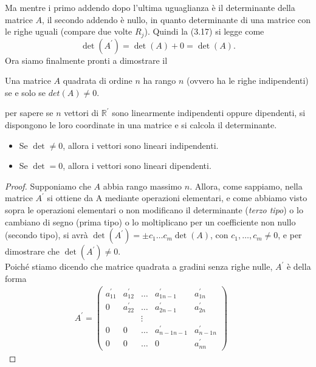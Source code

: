 Ma mentre i primo addendo dopo l'ultima uguaglianza è il determinante della matrice $A$, il
secondo addendo è nullo, in quanto determinante di una matrice con le righe uguali (compare
due volte $R_j$). Quindi la (3.17) si legge come
\begin{equation*}
  \det(A^\prime)=\det(A)+0=\det(A).
\end{equation*}
Ora siamo finalmente pronti a dimostrare il
\begin{teorema}
  Una matrice $A$ quadrata di ordine $n$ ha rango $n$ (ovvero ha le righe indipendenti) se e
  solo se $det (A)\neq 0$.
  \begin{osservazione}
    per sapere se $n$ vettori di $\mathds{R}^\prime$ sono linearmente indipendenti oppure
    dipendenti, si dispongono le loro coordinate in una matrice e si calcola il determinante.
    \begin{itemize}
    \item Se $\det \neq 0$, allora i vettori sono lineari indipendenti.
    \item Se $\det = 0$, allora i vettori sono lineari dipendenti.
    \end{itemize}
  \end{osservazione}
  \begin{proof}
    Supponiamo che $A$ abbia rango massimo $n$. Allora, come sappiamo, nella matrice $A^\prime$ si
    ottiene da A mediante operazioni elementari, e come abbiamo visto sopra le operazioni
    elementari o non modificano il determinante ({\it terzo tipo}) o lo cambiano di segno (prima
    tipo) o lo moltiplicano per un coefficiente non nullo (secondo tipo), si avrà
    $\det(A^\prime)=\pm c_1\dots c_m\det (A)$, con $c_1,\dots,c_m\neq 0$, e per dimostrare che
    $\det(A^\prime)\neq 0$.\\
    Poiché stiamo dicendo che matrice quadrata a gradini senza righe nulle, $A^\prime$ è della
    forma
    \begin{eqnarray*}
      A^\prime=\begin{pmatrix}
                 a^\prime_{11} & a^\prime_{12} & \dots &a^\prime_{1n-1}& a^\prime_{1n}\\
                 0           & a^\prime_{22} & \dots &a^\prime_{2n-1}& a^\prime_{2n}\\
                               && \vdots\\
                 0 & 0 & \dots &a^\prime_{n-1n-1}& a^\prime_{n-1n}\\
                 0 & 0 & \dots & 0 & a^\prime_{nn}
               \end{pmatrix} & \begin{matrix}

\end{matrix}
\end{eqnarray*}
\end{proof}
\end{teorema}
